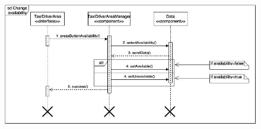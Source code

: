 \begin{landscape}
\begin{figure}[h]
			\end{figure}
			\newpage
			\begin{figure}[h]
				\centering
				\includegraphics[scale=0.85]{Diagrams/SDAvailability.jpg}
			\end{figure}
		\end{landscape}
		
	\newpage
